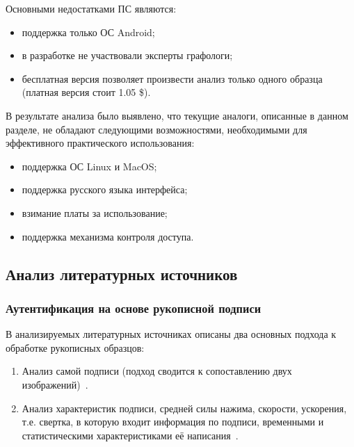 Основными недостатками ПС являются:
\begin{itemize}
  \item поддержка только ОС Android;
  \item в разработке не участвовали эксперты графологи;
  \item бесплатная версия позволяет произвести анализ только одного образца (платная версия стоит 1.05 \$).
\end{itemize}

В результате анализа было выявлено, что текущие аналоги, описанные в данном разделе, не обладают следующими возможностями, необходимыми для эффективного практического использования:
\begin{itemize}
  \item поддержка ОС Linux и MacOS;
  \item поддержка русского языка интерфейса;
  \item взимание платы за использование;
  \item поддержка механизма контроля доступа.
\end{itemize}

\subsection{Анализ литературных источников}
\label{sub:domain:literary_sources}

\subsubsection{Аутентификация на основе рукописной подписи}
В анализируемых литературных источниках описаны два основных подхода к обработке рукописных образцов:
\begin{enumerate}
  \item Анализ самой подписи (подход сводится к сопоставлению двух изображений)~\cite{hahgai_yamanaka_hamamoto, hastie_kishon, gurrala}.
  \item Анализ характеристик подписи, средней силы нажима, скорости, ускорения, т.е. свертка, в которую входит информация по подписи, временными и статистическими характеристиками её написания~\cite{bryxomickii, hao_chan}.
\end{enumerate}

